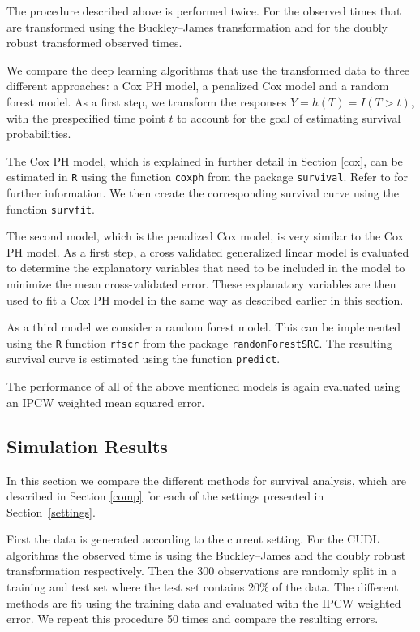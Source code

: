\documentclass[12pt, a4paper]{scrartcl}
\theoremstyle{definition}
\theoremstyle{plain}
\numberwithin{equation}{section}
\numberwithin{figure}{section}
\numberwithin{table}{section}
\begin{document}
	The procedure described above is performed twice.
	For the observed times that are transformed using the Buckley--James transformation and for the doubly robust transformed observed times.
	
	We compare the deep learning algorithms that use the transformed data to three different approaches: a Cox PH model, a penalized Cox model and a random forest model.
	As a first step, we transform the responses $Y=h(T)=I(T>t)$, with the prespecified time point $t$ to account for the goal of estimating survival probabilities.
	
	The Cox PH model, which is explained in further detail in Section \ref{cox}, can be estimated in \texttt{R} using the function \texttt{coxph} from the package \texttt{survival}.
	Refer to \citet*{survival-package} for further information.
	We then create the corresponding survival curve using the function \texttt{survfit}.
	
	The second model, which is the penalized Cox model, is very similar to the Cox PH model.
	As a first step, a cross validated generalized linear model is evaluated to determine the explanatory variables that need to be included in the model to minimize the mean cross-validated error.
	These explanatory variables are then used to fit a Cox PH model in the same way as described earlier in this section.
	
	As a third model we consider a random forest model.
	This can be implemented using the \texttt{R} function \texttt{rfscr} from the package \texttt{randomForestSRC}.
	The resulting survival curve is estimated using the function \texttt{predict}.
	
	The performance of all of the above mentioned models is again evaluated using an IPCW weighted mean squared error.
	
	\subsection{Simulation Results}
	In this section we compare the different methods for survival analysis, which are described in Section \ref{comp}  for each of the settings presented in Section~\ref{settings}.
	
	First the data is generated according to the current setting.
	For the CUDL algorithms the observed time is using the Buckley--James and the doubly robust transformation respectively.
	Then the 300 observations are randomly split in a training and test set where the test set contains $20\%$ of the data.
	The different methods are fit using the training data and evaluated with the IPCW weighted error.
	We repeat this procedure 50 times and compare the resulting errors.
	
\end{document}
